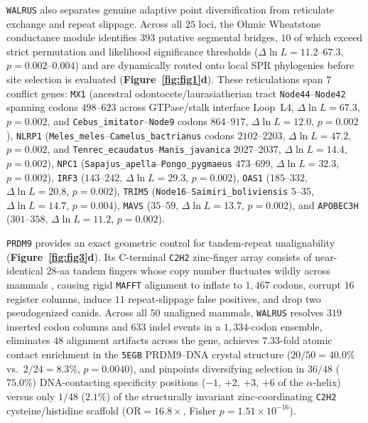 \documentclass[11pt,letterpaper]{article}
\newcommand{\WALRUS}{\texttt{WALRUS}\xspace}
\newcommand{\MAFFT}{\texttt{MAFFT}\xspace}
\begin{document}
\WALRUS also separates genuine adaptive point diversification from reticulate exchange and repeat slippage. Across all $25$ loci, the Ohmic Wheatstone conductance module identifies $393$ putative segmental bridges, $10$ of which exceed strict permutation and likelihood significance thresholds ($\Delta\ln L = 11.2$--$67.3$, $p = 0.002$--$0.004$) and are dynamically routed onto local SPR phylogenies before site selection is evaluated (\textbf{Figure~\ref{fig:fig1}d}). These reticulations span $7$ conflict genes: \texttt{MX1} (ancestral odontocete/laurasiatherian tract \texttt{Node44}--\texttt{Node42} spanning codons $498$--$623$ across GTPase/stalk interface Loop~L4, $\Delta\ln L = 67.3$, $p = 0.002$, and \texttt{Cebus\_imitator}--\texttt{Node9} codons $864$--$917$, $\Delta\ln L = 12.0$, $p = 0.002$), \texttt{NLRP1} (\texttt{Meles\_meles}--\texttt{Camelus\_bactrianus} codons $2102$--$2203$, $\Delta\ln L = 47.2$, $p = 0.002$, and \texttt{Tenrec\_ecaudatus}--\texttt{Manis\_javanica} $2027$--$2037$, $\Delta\ln L = 14.4$, $p = 0.002$), \texttt{NPC1} (\texttt{Sapajus\_apella}--\texttt{Pongo\_pygmaeus} $473$--$699$, $\Delta\ln L = 32.3$, $p = 0.002$), \texttt{IRF3} ($143$--$242$, $\Delta\ln L = 29.3$, $p = 0.002$), \texttt{OAS1} ($185$--$332$, $\Delta\ln L = 20.8$, $p = 0.002$), \texttt{TRIM5} (\texttt{Node16}--\texttt{Saimiri\_boliviensis} $5$--$35$, $\Delta\ln L = 14.7$, $p = 0.004$), \texttt{MAVS} ($35$--$59$, $\Delta\ln L = 13.7$, $p = 0.002$), and \texttt{APOBEC3H} ($301$--$358$, $\Delta\ln L = 11.2$, $p = 0.002$).

\texttt{PRDM9} provides an exact geometric control for tandem-repeat unalignability (\textbf{Figure~\ref{fig:fig3}d}). Its C-terminal \texttt{C2H2} zinc-finger array consists of near-identical $28$-aa tandem fingers whose copy number fluctuates wildly across mammals \citep{oliver2009prdm9,patel2016prdm9gene}, causing rigid \MAFFT alignment to inflate to $1,467$ codons, corrupt $16$ register columns, induce $11$ repeat-slippage false positives, and drop two pseudogenized canids. Across all $50$ unaligned mammals, \WALRUS resolves $319$ inserted codon columns and $633$ indel events in a $1,334$-codon ensemble, eliminates $48$ alignment artifacts across the gene, achieves $7.33$-fold atomic contact enrichment in the \texttt{5EGB} PRDM9--DNA crystal structure ($20/50 = 40.0\%$ vs.\ $2/24 = 8.3\%$, $p = 0.0040$), and pinpoints diversifying selection in $36/48$ ($75.0\%$) DNA-contacting specificity positions ($-1$, $+2$, $+3$, $+6$ of the $\alpha$-helix) versus only $1/48$ ($2.1\%$) of the structurally invariant zinc-coordinating \texttt{C2H2} cysteine/histidine scaffold ($\mathrm{OR} = 16.8\times$, Fisher $p = 1.51 \times 10^{-16}$).
\end{document}

